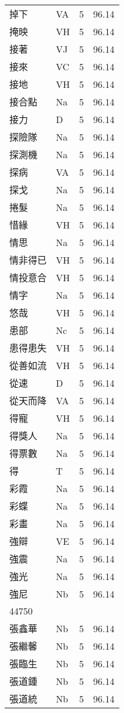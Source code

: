 \documentclass[twocolumn]{book}
\begin{document}
\begin{supertabular}{llrr}
掉下 & VA & 5 &  96.14\\
掩映 & VH & 5 &  96.14\\
接著 & VJ & 5 &  96.14\\
接來 & VC & 5 &  96.14\\
接地 & VH & 5 &  96.14\\
接合點 & Na & 5 &  96.14\\
接力 & D & 5 &  96.14\\
探險隊 & Na & 5 &  96.14\\
探測機 & Na & 5 &  96.14\\
探病 & VA & 5 &  96.14\\
探戈 & Na & 5 &  96.14\\
捲髮 & Na & 5 &  96.14\\
惜緣 & VH & 5 &  96.14\\
情思 & Na & 5 &  96.14\\
情非得已 & VH & 5 &  96.14\\
情投意合 & VH & 5 &  96.14\\
情字 & Na & 5 &  96.14\\
悠哉 & VH & 5 &  96.14\\
患部 & Nc & 5 &  96.14\\
患得患失 & VH & 5 &  96.14\\
從善如流 & VH & 5 &  96.14\\
從速 & D & 5 &  96.14\\
從天而降 & VA & 5 &  96.14\\
得寵 & VH & 5 &  96.14\\
得獎人 & Na & 5 &  96.14\\
得票數 & Na & 5 &  96.14\\
得 & T & 5 &  96.14\\
彩霞 & Na & 5 &  96.14\\
彩蝶 & Na & 5 &  96.14\\
彩畫 & Na & 5 &  96.14\\
強辯 & VE & 5 &  96.14\\
強震 & Na & 5 &  96.14\\
強光 & Na & 5 &  96.14\\
強尼 & Nb & 5 &  96.14\\
44750\\
張鑫華 & Nb & 5 &  96.14\\
張繼馨 & Nb & 5 &  96.14\\
張臨生 & Nb & 5 &  96.14\\
張道鍾 & Nb & 5 &  96.14\\
張道統 & Nb & 5 &  96.14\\

\end{supertabular}
\end{document}
